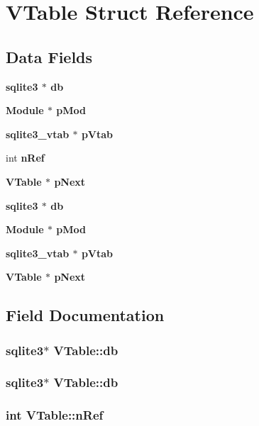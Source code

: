 \section{VTable Struct Reference}
\label{structVTable}
\subsection*{Data Fields}
\begin{CompactItemize}
\item 
\bf{sqlite3} $\ast$ \bf{db}
\item 
\bf{Module} $\ast$ \bf{p\-Mod}
\item 
\bf{sqlite3\_\-vtab} $\ast$ \bf{p\-Vtab}
\item 
int \bf{n\-Ref}
\item 
\bf{VTable} $\ast$ \bf{p\-Next}
\item 
\bf{sqlite3} $\ast$ \bf{db}
\item 
\bf{Module} $\ast$ \bf{p\-Mod}
\item 
\bf{sqlite3\_\-vtab} $\ast$ \bf{p\-Vtab}
\item 
\bf{VTable} $\ast$ \bf{p\-Next}
\end{CompactItemize}


\subsection{Field Documentation}
\subsubsection{\setlength{\rightskip}{0pt plus 5cm}\bf{sqlite3}$\ast$ \bf{VTable::db}}\label{structVTable_818bd2aa3dbd0421dacbf5e8b14bbb11}


\subsubsection{\setlength{\rightskip}{0pt plus 5cm}\bf{sqlite3}$\ast$ \bf{VTable::db}}\label{structVTable_818bd2aa3dbd0421dacbf5e8b14bbb11}


\subsubsection{\setlength{\rightskip}{0pt plus 5cm}int \bf{VTable::n\-Ref}}\label{structVTable_f8b252e69712c584bc83b356f05a35cf}


